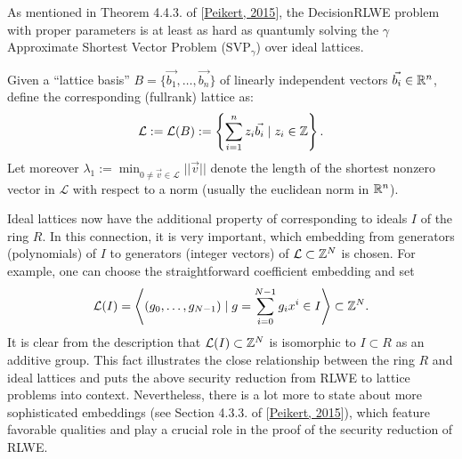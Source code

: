 \documentclass[letterpaper,10pt,english]{jupyterBook}
\begin{document}
\sphinxAtStartPar
As mentioned in Theorem 4.4.3. of {[}\hyperlink{cite.Thesis:id65}{Peikert, 2015}{]}, the Decision\sphinxhyphen{}RLWE problem with proper parameters is at least as hard as quantumly solving the \(\gamma\)\sphinxhyphen{}Approximate Shortest Vector Problem (\(\mathrm{SVP}_\gamma\)) over ideal lattices.

\begin{DUlineblock}{0em}
\item[] 
\end{DUlineblock}

\sphinxAtStartPar
Given a “lattice basis” \(B = \{\vec{b_1},\dots,\vec{b_n}\}\) of linearly independent vectors \(\vec{b_i} \in \mathbb R^n\), define the corresponding (full\sphinxhyphen{}rank) lattice as:
\begin{equation*}
\begin{split}\mathcal L := \mathcal L(B) := \left\{\sum_{i=1}^n z_i\vec{b_i} \mid z_i \in \mathbb Z \right\}.\end{split}
\end{equation*}
\sphinxAtStartPar
Let moreover \(\lambda_1 := \min_{0 \neq \vec v \in \mathcal L} \lvert\lvert \vec v \rvert\rvert\) denote the length of the shortest non\sphinxhyphen{}zero vector in \(\mathcal L\) with respect to a norm (usually the euclidean norm in \(\mathbb R^n\)).

\sphinxAtStartPar
Ideal lattices now have the additional property of corresponding to ideals \(I\) of the ring \(R\).
In this connection, it is very important, which embedding from generators (polynomials) of \(I\) to generators (integer vectors) of \(\mathcal L \subset \mathbb Z^N\) is chosen.
For example, one can choose the straightforward coefficient embedding and set
\begin{equation*}
\begin{split}\mathcal L(I) = \left\langle(g_0,\dots,g_{N-1}) \mid g = \sum_{i=0}^{N-1} g_i x^i \in I \right\rangle \subset \mathbb Z^N.\end{split}
\end{equation*}
\sphinxAtStartPar
It is clear from the description that \(\mathcal L(I) \subset \mathbb Z^N\) is isomorphic to \(I \subset R\) as an additive group.
This fact illustrates the close relationship between the ring \(R\) and ideal lattices and puts the above security reduction from RLWE to lattice problems into context.
Nevertheless, there is a lot more to state about more sophisticated embeddings (see Section 4.3.3. of {[}\hyperlink{cite.Thesis:id65}{Peikert, 2015}{]}), which feature favorable qualities and play a crucial role in the proof of the security reduction of RLWE.
\end{document}
